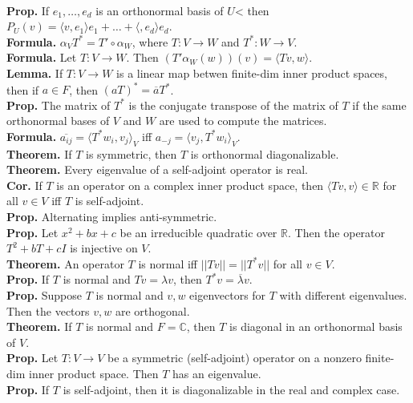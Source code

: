 	\\ \textbf{Prop. } If $e_1,\dots,e_d$ is an orthonormal basis of $U$< then $P_U(v) = \langle v,e_1 \rangle e_1 + \dots + \langle ,e_d \rangle e_d$. 
	\\ \textbf{Formula. } $\alpha_V T^* = T' \circ \alpha_W$, where $T: V \to W$ and $T^*: W \to V$. 
	\\ \textbf{Formula. } Let $T: V \to W$. Then $(T'\alpha_W(w))(v) = \langle Tv,w \rangle$. 
	\\ \textbf{Lemma. } If $T: V \to W$ is a linear map betwen finite-dim inner product spaces, then if $a \in F$, then $(aT)^* = \overline{a}T^*$. 
	\\ \textbf{Prop. } The matrix of $T^*$ is the conjugate transpose of the matrix of $T$ if the same orthonormal bases of $V$ and $W$ are used to compute the matrices. 
	\\ \textbf{Formula. } $\overline{a_{ij}} = \langle T^*w_i, v_j \rangle_V$ iff $a_{-j} = \langle v_j, T^*w_i \rangle_V$. 
	\\ \textbf{Theorem. } If $T$ is symmetric, then $T$ is orthonormal diagonalizable. 
	\\ \textbf{Theorem. } Every eigenvalue of a self-adjoint operator is real. 
	\\ \textbf{Cor. } If $T$ is an operator on a complex inner product space, then $\langle Tv,v \rangle \in \mathbb{R}$ for all $v \in V$ iff $T$ is self-adjoint. 
	\\ \textbf{Prop. } Alternating implies anti-symmetric. 
	\\ \textbf{Prop. } Let $x^2 + bx + c$ be an irreducible quadratic over $\mathbb{R}$. Then the operator $T^2 + bT + cI$ is injective on $V$. 
	\\ \textbf{Theorem. } An operator $T$ is normal iff $||Tv|| = ||T^*v||$ for all $v \in V$. 
	\\ \textbf{Prop. } If $T$ is normal and $Tv = \lambda v$, then $T^*v = \overline{\lambda}v$. 
	\\ \textbf{Prop. } Suppose $T$ is normal and $v,w$ eigenvectors for $T$ with different eigenvalues. Then the vectors $v,w$ are orthogonal. 
	\\ \textbf{Theorem. } If $T$ is normal and $F = \mathbb{C}$, then $T$ is diagonal in an orthonormal basis of $V$. 
	\\ \textbf{Prop. } Let $T: V \to V$ be a symmetric (self-adjoint) operator on a nonzero finite-dim inner product space. Then $T$ has an eigenvalue. 
	\\ \textbf{Prop. } If $T$ is self-adjoint, then it is diagonalizable in the real and complex case. 
